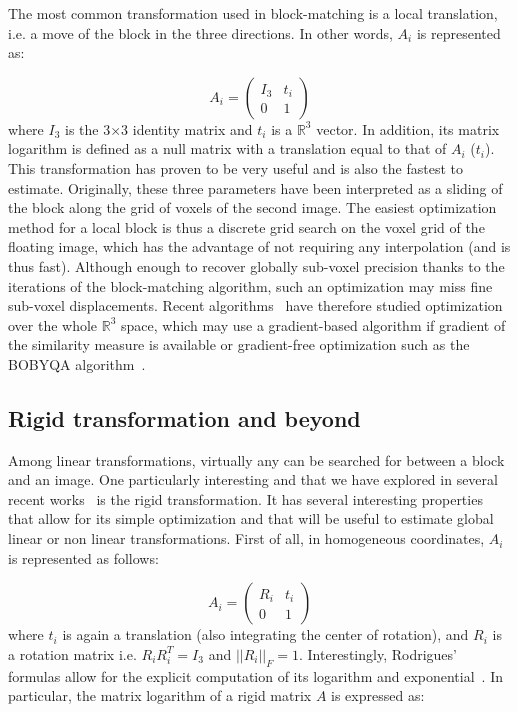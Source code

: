 The most common transformation used in block-matching is a local translation, i.e. a move of the block in the three directions. In other words, $A_i$ is represented as:

\begin{equation}
	A_i = \begin{pmatrix} I_3 & t_i \\ 0 & 1 \end{pmatrix}
\end{equation}
where $I_3$ is the 3$\times$3 identity matrix and $t_i$ is a $\mathbb{R}^3$ vector. In addition, its matrix logarithm is defined as a null matrix with a translation equal to that of $A_i$ ($t_i$). This transformation has proven to be very useful and is also the fastest to estimate. Originally, these three parameters have been interpreted as a sliding of the block along the grid of voxels of the second image. The easiest optimization method for a local block is thus a discrete grid search on the voxel grid of the floating image, which has the advantage of not requiring any interpolation (and is thus fast). Although enough to recover globally sub-voxel precision thanks to the iterations of the block-matching algorithm, such an optimization may miss fine sub-voxel displacements. Recent algorithms~\cite{commowick:inserm-00681610} have therefore studied optimization over the whole $\mathbb{R}^3$ space, which may use a gradient-based algorithm if gradient of the similarity measure is available or gradient-free optimization such as the BOBYQA algorithm~\cite{Powell09a}.

\subsection{Rigid transformation and beyond}

Among linear transformations, virtually any can be searched for between a block and an image. One particularly interesting and that we have explored in several recent works~\cite{commowick:inserm-00681610,Commowick_Miccai_2012} is the rigid transformation. It has several interesting properties that allow for its simple optimization and that will be useful to estimate global linear or non linear transformations. First of all, in homogeneous coordinates, $A_i$ is represented as follows:

\begin{equation}
	A_i = \begin{pmatrix} R_i & t_i \\ 0 & 1 \end{pmatrix}
\end{equation}
where $t_i$ is again a translation (also integrating the center of rotation), and $R_i$ is a rotation matrix i.e. $R_i R_i^T = I_3$ and $|| R_i ||_F = 1$. Interestingly, Rodrigues' formulas allow for the explicit computation of its logarithm and exponential~\cite{blanco2010tutorial}. In particular, the matrix logarithm of a rigid matrix $A$ is expressed as:

